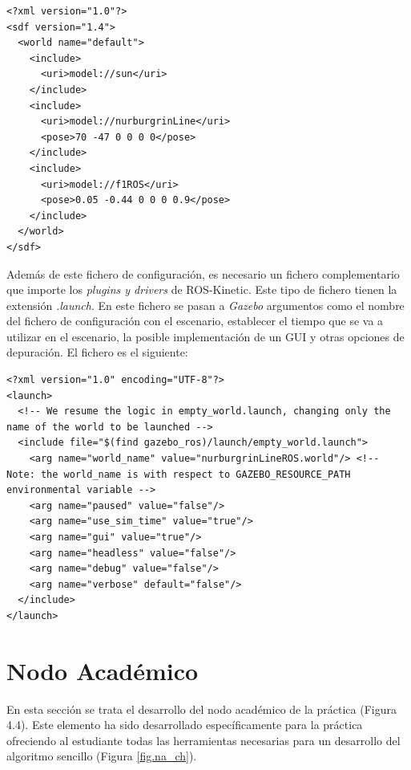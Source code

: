 \lstset{language=XML, breaklines=true, basicstyle=\footnotesize}
\begin{lstlisting}[frame=single]
<?xml version="1.0"?>
<sdf version="1.4">
  <world name="default">
    <include>
      <uri>model://sun</uri>
    </include>
    <include>
      <uri>model://nurburgrinLine</uri>
      <pose>70 -47 0 0 0 0</pose>
    </include>
    <include>
      <uri>model://f1ROS</uri>
      <pose>0.05 -0.44 0 0 0 0.9</pose>
    </include>
  </world>
</sdf>
\end{lstlisting}

Además de este fichero de configuración, es necesario un fichero complementario que importe los \textit{plugins y drivers} de ROS-Kinetic. Este tipo de fichero tienen la extensión \textit{.launch}. En este fichero se pasan a \textit{Gazebo} argumentos como el nombre del fichero de configuración con el escenario, establecer el tiempo que se va a utilizar en el escenario, la posible implementación de un GUI y otras opciones de depuración.
El fichero es el siguiente:

\lstset{language=XML, breaklines=true, basicstyle=\footnotesize}
\begin{lstlisting}[frame=single]
<?xml version="1.0" encoding="UTF-8"?>
<launch>
  <!-- We resume the logic in empty_world.launch, changing only the name of the world to be launched -->
  <include file="$(find gazebo_ros)/launch/empty_world.launch">
    <arg name="world_name" value="nurburgrinLineROS.world"/> <!-- Note: the world_name is with respect to GAZEBO_RESOURCE_PATH environmental variable -->
    <arg name="paused" value="false"/>
    <arg name="use_sim_time" value="true"/>
    <arg name="gui" value="true"/>
    <arg name="headless" value="false"/>
    <arg name="debug" value="false"/>
    <arg name="verbose" default="false"/>
  </include>
</launch>
\end{lstlisting}

\section{Nodo Académico}
En esta sección se trata el desarrollo del nodo académico de la práctica (Figura 4.4). Este elemento ha sido desarrollado específicamente para la práctica ofreciendo al estudiante todas las herramientas necesarias para un desarrollo del algoritmo sencillo (Figura \ref{fig.na_ch}).


